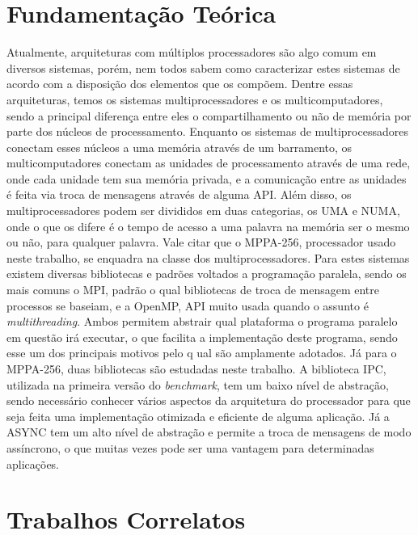 \begin{resumo}
\section*{Fundamentação Teórica} 
Atualmente, arquiteturas com múltiplos processadores são algo comum em diversos sistemas, porém, nem todos sabem como caracterizar estes sistemas de acordo com a disposição dos elementos que os compõem. Dentre essas arquiteturas, temos os sistemas multiprocessadores e os multicomputadores, sendo a principal diferença entre eles o compartilhamento ou não de memória por parte dos núcleos de processamento. Enquanto os sistemas de multiprocessadores conectam esses núcleos a uma memória através de um barramento, os multicomputadores conectam as unidades de processamento através de uma rede, onde cada unidade tem sua memória privada, e a comunicação entre as unidades é feita via troca de mensagens através de alguma API. Além disso, os multiprocessadores podem ser divididos em duas categorias, os UMA e NUMA, onde o que os difere é o tempo de acesso a uma palavra na memória ser o mesmo ou não, para qualquer palavra. Vale citar que o MPPA-256, processador usado neste trabalho, se enquadra na classe dos multiprocessadores. Para estes sistemas existem diversas bibliotecas e padrões voltados a programação paralela, sendo os mais comuns o MPI, padrão o qual bibliotecas de troca de mensagem entre processos se baseiam, e a OpenMP, API muito usada quando o assunto é \textit{multithreading}. Ambos permitem abstrair qual plataforma o programa paralelo em questão irá executar, o que facilita a implementação deste programa, sendo esse um dos principais motivos pelo q ual são amplamente adotados. Já para o MPPA-256, duas bibliotecas são estudadas neste trabalho. A biblioteca IPC, utilizada na primeira versão do \textit{benchmark}, tem um baixo nível de abstração, sendo necessário conhecer vários aspectos da arquitetura do processador para que seja feita uma implementação otimizada e eficiente de alguma aplicação. Já a ASYNC tem um alto nível de abstração e permite a troca de mensagens de modo assíncrono, o que muitas vezes pode ser uma vantagem para determinadas aplicações.

\section*{Trabalhos Correlatos} 
  

\end{resumo}
